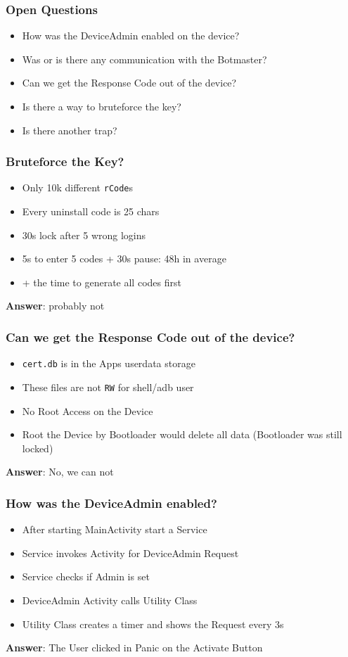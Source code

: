 \documentclass[12pt,a4paper]{beamer}
\begin{document}
\begin{frame}
\frametitle{Open Questions}
\begin{itemize}
	\item How was the DeviceAdmin enabled on the device?
	\item Was or is there any communication with the Botmaster?
	\item Can we get the Response Code out of the device?
	\item Is there a way to bruteforce the key?
	\item Is there another trap?
\end{itemize}
\end{frame}

\begin{frame}
\frametitle{Bruteforce the Key?}
\begin{itemize}
	\item Only 10k different \texttt{rCode}s
	\item Every uninstall code is 25 chars
	\item 30s lock after 5 wrong logins
	\item 5s to enter 5 codes + 30s pause: 48h in average
	\item + the time to generate all codes first
\end{itemize}

\textbf{Answer}: probably not

\end{frame}

\begin{frame}
\frametitle{Can we get the Response Code out of the device?}
\begin{itemize}
	\item \texttt{cert.db} is in the Apps userdata storage
	\item These files are not \texttt{RW} for shell/adb user
	\item No Root Access on the Device
	\item Root the Device by Bootloader would delete all data (Bootloader was still locked)
\end{itemize}

\textbf{Answer}: No, we can not
\end{frame}

\begin{frame}
\frametitle{How was the DeviceAdmin enabled?}

\begin{itemize}
	\item After starting MainActivity start a Service
	\item Service invokes Activity for DeviceAdmin Request
	\item Service checks if Admin is set
	\item DeviceAdmin Activity calls Utility Class
	\item Utility Class creates a timer and shows the Request every 3s
\end{itemize}

\textbf{Answer}: The User clicked in Panic on the Activate Button

\end{frame}
\end{document}
